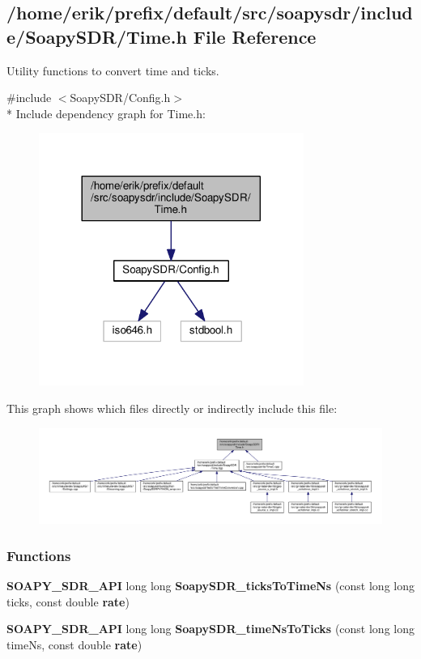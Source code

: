 \subsection{/home/erik/prefix/default/src/soapysdr/include/\+Soapy\+S\+D\+R/\+Time.h File Reference}
\label{Time_8h}


Utility functions to convert time and ticks.  


{\ttfamily \#include $<$Soapy\+S\+D\+R/\+Config.\+h$>$}\\*
Include dependency graph for Time.\+h\+:
\nopagebreak
\begin{figure}[H]
\begin{center}
\leavevmode
\includegraphics[width=245pt]{db/dcd/Time_8h__incl}
\end{center}
\end{figure}
This graph shows which files directly or indirectly include this file\+:
\nopagebreak
\begin{figure}[H]
\begin{center}
\leavevmode
\includegraphics[width=350pt]{d0/dea/Time_8h__dep__incl}
\end{center}
\end{figure}
\subsubsection*{Functions}
\begin{DoxyCompactItemize}
\item 
{\bf S\+O\+A\+P\+Y\+\_\+\+S\+D\+R\+\_\+\+A\+PI} long long {\bf Soapy\+S\+D\+R\+\_\+ticks\+To\+Time\+Ns} (const long long ticks, const double {\bf rate})
\item 
{\bf S\+O\+A\+P\+Y\+\_\+\+S\+D\+R\+\_\+\+A\+PI} long long {\bf Soapy\+S\+D\+R\+\_\+time\+Ns\+To\+Ticks} (const long long time\+Ns, const double {\bf rate})
\end{DoxyCompactItemize}


